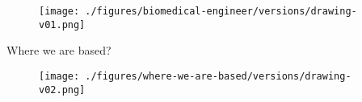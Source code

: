 {
\begin{frame}{}

  \begin{figure}
  \centering
  \texttt{[image: ./figures/biomedical-engineer/versions/drawing-v01.png]}
  \end{figure}

\end{frame}
}




{
\begin{frame}{Where we are based?}

  \begin{figure}
  \centering
  \texttt{[image: ./figures/where-we-are-based/versions/drawing-v02.png]}
  \end{figure}

\end{frame}
}
